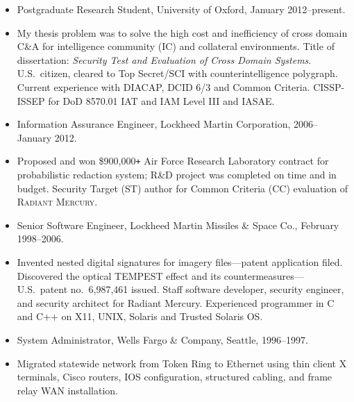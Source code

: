 \documentclass[12pt,letterpaper]{article}
\newenvironment{myquote}{\list{}{\leftmargin=0.25in\rightmargin=0in}\item[]}{\endlist}
\begin{document}
\begin{itemize}
	\item Postgraduate Research Student, University of Oxford, January 2012--present.
		\vspace{-2mm}
		\begin{myquote}
			My thesis problem was to solve the high cost and inefficiency of cross domain
			C\&A for intelligence community (IC) and collateral environments.  Title of dissertation:
			\emph{Security Test and Evaluation of Cross Domain Systems}.
			U.S.\ citizen, cleared to Top Secret/SCI with counterintelligence polygraph.
			Current experience with DIACAP, DCID 6/3 and Common Criteria.
			CISSP-ISSEP for DoD 8570.01 IAT and IAM Level III and IASAE.
		\end{myquote}

\vspace{-2.5mm}
	\item Information Assurance Engineer, Lockheed Martin Corporation, 2006--January 2012.
		\vspace{-2mm}
		\begin{myquote}
			Proposed and won \$900,000\texttt{+} Air Force Research Laboratory contract
			for probabilistic redaction system; R\&D project was completed on time
			and in budget.  Security Target (ST) author for Common Criteria (CC)
			evaluation of \textsc{Radiant Mercury}.
		\end{myquote}

\vspace{-2.5mm}
	\item Senior Software Engineer, Lockheed Martin Missiles \& Space Co., February 1998--2006.
		\vspace{-2mm}
		\begin{myquote}
			Invented nested digital signatures for imagery files---patent application filed.
			Discovered the optical TEMPEST effect and its
			countermeasures---U.S.\ patent no.\ 6,987,461 issued.  Staff software developer,
			security engineer, and security architect for
			Radiant Mercury.  Experienced programmer in C and C++ on X11, UNIX, Solaris and
			Trusted Solaris OS.
		\end{myquote}
	
\vspace{-2.5mm}
	\item System Administrator, Wells Fargo \& Company, Seattle, 1996--1997.
		\vspace{-2mm}
		\begin{myquote}
			Migrated statewide network from Token Ring to Ethernet using thin client X
			terminals, Cisco routers, IOS configuration, structured cabling, and frame relay
			WAN installation.
		\end{myquote}


\end{itemize}
\end{document}
